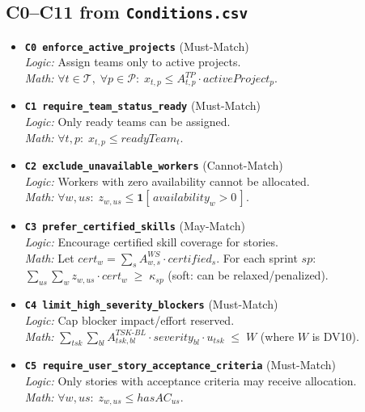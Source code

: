 \documentclass[11pt,a4paper]{article}
\begin{document}
\subsection*{C0--C11 from \texttt{Conditions.csv}}
\begin{itemize}[leftmargin=2em]
  \item \textbf{\texttt{C0 enforce\_active\_projects}} (Must-Match) \\
    \textit{Logic:} Assign teams only to active projects. \\
    \textit{Math:}\; $\forall t\in\mathcal{T},\; \forall p\in\mathcal{P}:\; x_{t,p} \le A^{TP}_{t,p}\cdot activeProject_p$.

  \item \textbf{\texttt{C1 require\_team\_status\_ready}} (Must-Match) \\
    \textit{Logic:} Only ready teams can be assigned. \\
    \textit{Math:}\; $\forall t,p:\; x_{t,p} \le readyTeam_t$.

  \item \textbf{\texttt{C2 exclude\_unavailable\_workers}} (Cannot-Match) \\
    \textit{Logic:} Workers with zero availability cannot be allocated. \\
    \textit{Math:}\; $\forall w,us:\; z_{w,us} \le \mathbf{1}[\,availability_w>0\,]$.

  \item \textbf{\texttt{C3 prefer\_certified\_skills}} (May-Match) \\
    \textit{Logic:} Encourage certified skill coverage for stories. \\
    \textit{Math:}\; Let $cert_w = \sum_{s} A^{WS}_{w,s}\cdot certified_s$. For each sprint $sp$: $\sum_{us}\sum_{w} z_{w,us} \cdot cert_w \;\ge\; \kappa_{sp}$ (soft: can be relaxed/penalized).

  \item \textbf{\texttt{C4 limit\_high\_severity\_blockers}} (Must-Match) \\
    \textit{Logic:} Cap blocker impact/effort reserved. \\
    \textit{Math:}\; $\sum_{tsk}\sum_{bl} A^{TSK\text{-}BL}_{tsk,bl}\cdot severity_{bl}\cdot u_{tsk} \;\le\; W$ (where $W$ is DV10).

  \item \textbf{\texttt{C5 require\_user\_story\_acceptance\_criteria}} (Must-Match) \\
    \textit{Logic:} Only stories with acceptance criteria may receive allocation. \\
    \textit{Math:}\; $\forall w,us:\; z_{w,us} \le hasAC_{us}$.


\end{itemize}
\end{document}
